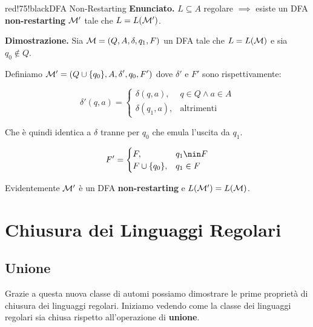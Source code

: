 \begin{halfframedbox}{red!75!black}{DFA Non-Restarting}
  \textbf{Enunciato. } \(L\subseteq A\) regolare \(\implies\) %
   esiste un DFA \textbf{non-restarting} \(\mathcal{M}'\) tale che \(L=L(\mathcal{M}')\).

  \begin{center}
    \textcolor{red!75!black}{\hdashrule[0.5ex]{18cm}{1pt}{3mm 3pt 1mm 2pt}}
  \end{center}

  \textbf{Dimostrazione. } Sia \(\mathcal{M}=(Q,A,\delta,q_1,F)\) un DFA tale che \(L=L(\mathcal{M})\) e sia \(q_0 \nin Q\).

  Definiamo \(\mathcal{M}'=(Q\cup\displaystyle{\left\{{q_0}\right\}},A,\delta',q_0,F')\) dove \(\delta'\) e \(F'\) sono rispettivamente:

  \begin{equation}
    \delta'(q,a)=\begin{cases}
      \delta(q,a), & q \in Q \land a \in A\\
      \delta(q_1,a), &\text{altrimenti}
    \end{cases}
  \end{equation}

  Che è quindi identica a \(\delta\) tranne per \(q_0\) che emula l'uscita da \(q_1\).

  \begin{equation}
    F'=\begin{cases}
      F, & q_1 \nin F\\
      F \cup \cbrakets{q_0}, & q_1 \in F
    \end{cases}
  \end{equation}

  Evidentemente \(\mathcal{M}'\) è un DFA \textbf{non-restarting} e \(L(\mathcal{M}')=L(\mathcal{M})\).
\end{halfframedbox}

\section{Chiusura dei Linguaggi Regolari}

\subsection{Unione}

Grazie a questa nuova classe di automi possiamo dimostrare le prime proprietà di chiusura dei linguaggi regolari. Iniziamo vedendo come la classe dei linguaggi regolari sia chiusa rispetto all'operazione di \textbf{unione}.

